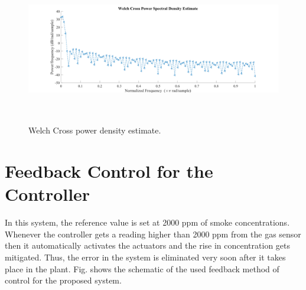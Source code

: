 \begin{enumerate}[label=\roman*]

\par

\par


\vspace{\baselineskip}



\begin{figure}[H]
	\begin{Center}
		\includegraphics[width=6.52in,height=2.59in]{32}
	\end{Center}
\caption{Welch Cross power density estimate.}
\end{figure}



\par

\par
\end{enumerate}
\setlength{\parskip}{8.04pt}
\section{Feedback Control for the Controller }
\begin{justify}
In this system, the reference value is set at 2000 ppm of smoke concentrations. Whenever the controller gets a reading higher than 2000 ppm from the gas sensor then it automatically activates the actuators and the rise in concentration gets mitigated. Thus, the error in the system is eliminated very soon after it takes place in the plant. Fig. shows the schematic of the used feedback method of control for the proposed system.
\end{justify}\par



